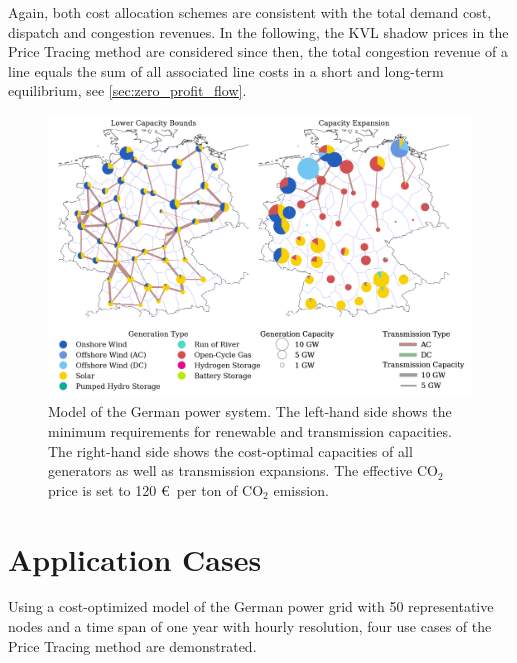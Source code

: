 \documentclass[11pt,twocolumn]{article}
\begin{document}
Again, both cost allocation schemes are consistent with the total demand cost, dispatch and congestion revenues. In the following, the \ac{KVL} shadow prices in the Price Tracing method are considered since then, the total congestion revenue of a line equals the sum of all associated line costs in a short and long-term equilibrium, see \cref{sec:zero_profit_flow}.  

\begin{figure}[h!]
    \centering
    \includegraphics[width=\linewidth]{de50/network}
    \caption{Model of the German power system. The left-hand side shows the minimum requirements for renewable and transmission capacities. The right-hand side shows the cost-optimal capacities of all generators as well as transmission expansions. The effective CO$_2$ price is set to 120 \euro\, per ton of CO$_2$ emission.}
    \label{fig:network}
\end{figure}
 

\section{Application Cases}
\label{sec:application_case}

Using a cost-optimized model of the German power grid with 50 representative nodes and a time span of one year with hourly resolution, four use cases of the Price Tracing method are demonstrated. 
\end{document}
